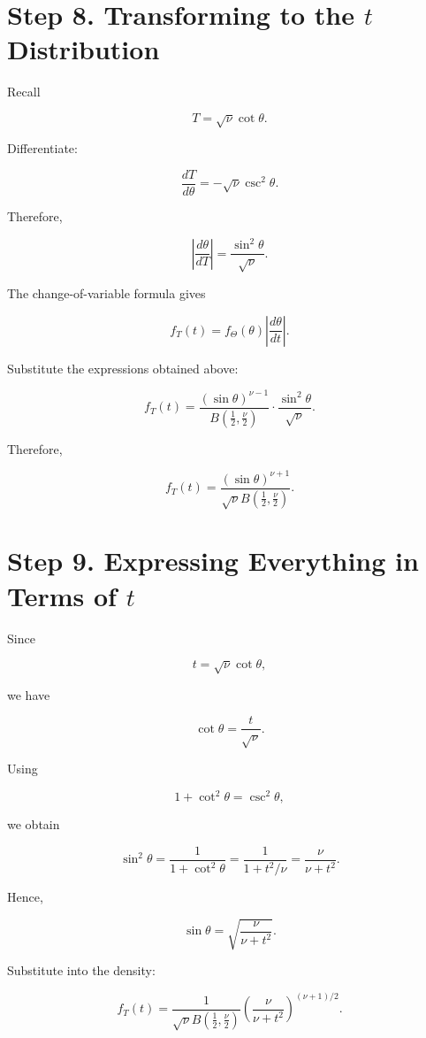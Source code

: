 \documentclass[11pt]{article}
\begin{document}
	\section{Step 8. Transforming to the $t$ Distribution}
	
	Recall
	
	\[
	T
	=
	\sqrt{\nu}\cot\theta.
	\]
	
	Differentiate:
	
	\[
	\frac{dT}{d\theta}
	=
	-\sqrt{\nu}\csc^2\theta.
	\]
	
	Therefore,
	
	\[
	\left|
	\frac{d\theta}{dT}
	\right|
	=
	\frac{\sin^2\theta}{\sqrt{\nu}}.
	\]
	
	The change-of-variable formula gives
	
	\[
	f_T(t)
	=
	f_\Theta(\theta)
	\left|
	\frac{d\theta}{dt}
	\right|.
	\]
	
	Substitute the expressions obtained above:
	
	\[
	f_T(t)
	=
	\frac{
		(\sin\theta)^{\nu-1}
	}{
		B\left(\frac12,\frac\nu2\right)
	}
	\cdot
	\frac{\sin^2\theta}{\sqrt{\nu}}.
	\]
	
	Therefore,
	
	\[
	f_T(t)
	=
	\frac{
		(\sin\theta)^{\nu+1}
	}{
		\sqrt{\nu}
		B\left(\frac12,\frac\nu2\right)
	}.
	\]
	
	
	\section{Step 9. Expressing Everything in Terms of $t$}
	
	Since
	
	\[
	t
	=
	\sqrt{\nu}\cot\theta,
	\]
	
	we have
	
	\[
	\cot\theta
	=
	\frac{t}{\sqrt{\nu}}.
	\]
	
	Using
	
	\[
	1+\cot^2\theta
	=
	\csc^2\theta,
	\]
	
	we obtain
	
	\[
	\sin^2\theta
	=
	\frac1{1+\cot^2\theta}
	=
	\frac1{1+t^2/\nu}
	=
	\frac{\nu}{\nu+t^2}.
	\]
	
	Hence,
	
	\[
	\sin\theta
	=
	\sqrt{\frac{\nu}{\nu+t^2}}.
	\]
	
	Substitute into the density:
	
	\[
	f_T(t)
	=
	\frac1{
		\sqrt{\nu}
		B\left(\frac12,\frac\nu2\right)
	}
	\left(
	\frac{\nu}{\nu+t^2}
	\right)^{(\nu+1)/2}.
	\]
	
\end{document}
